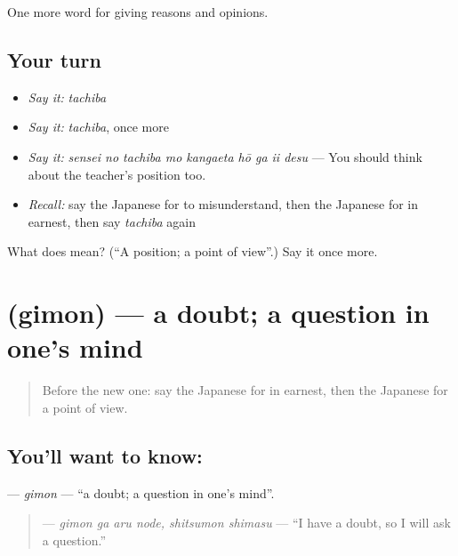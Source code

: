 \begin{grammarlens}[title={What you've built}]
One more word for giving reasons and opinions.
\end{grammarlens}

\subsection*{Your turn}
\begin{itemize}
\raggedright
  \item \emph{Say it:} \emph{tachiba}
  \item \emph{Say it:} \emph{tachiba}, once more
  \item \emph{Say it:} \emph{sensei no tachiba mo kangaeta hō ga ii desu} — You should think about the teacher's position too.
  \item \emph{Recall:} say the Japanese for to misunderstand, then the Japanese for in earnest, then say \emph{tachiba} again
\end{itemize}

\begin{tcolorbox}[breakable,colback=teal!4,colframe=teal!35!black,title={Before you move on}]
What does  mean? (\textquotedblleft{}A position; a point of view\textquotedblright{}.) Say it once more.
\end{tcolorbox}
\section[\texorpdfstring{\ja{ぎもん} (gimon)}{ぎもん (gimon)}]{ (gimon) — a doubt; a question in one's mind}

\label{lesson:JA-C320-gimon}



\begin{quote}
Before the new one: say the Japanese for in earnest, then the Japanese for a point of view.
\end{quote}

\subsection*{You'll want to know: }
\textbf{} — \emph{gimon} — \textquotedblleft{}a doubt; a question in one's mind\textquotedblright{}.

\begin{quote}
\textbf{ } — \emph{gimon ga aru node, shitsumon shimasu} — \textquotedblleft{}I have a doubt, so I will ask a question.\textquotedblright{}
\end{quote}

